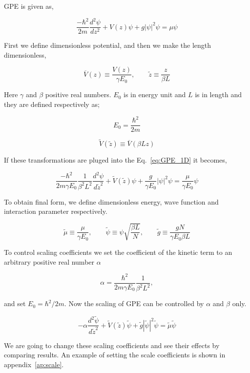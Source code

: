 \documentclass[a4paper,times,12pt]{article}
\begin{document}
GPE is given as,

\begin{equation}
    \label{eq:GPE_1D}
    \frac{-\hbar^2}{2m}\frac{d^2\psi}{dz^2} + V(z)\psi + g|\psi|^2\psi = \mu\psi
\end{equation}

First we define dimensionless potential, and then we make the length dimensionless,

$$ \overline{V}(z) \equiv \frac{V(z)}{\gamma E_0}, \qquad \widetilde{z} \equiv \frac{z}{\beta L} $$

Here $\gamma$ and $\beta$ positive real numbers. $E_0$ is in energy unit and $L$ is in length and they are defined respectively as;

$$E_0 = \frac{\hbar^2}{2m} $$


$$ \widetilde{V}(\widetilde{z}) \equiv \overline{V}(\beta L z) $$ 

If these transformations are pluged into the Eq.~\eqref{eq:GPE_1D} it becomes,

\begin{equation}
    \label{eq:GPE_1D_dimensionless_en_len}
    \frac{-\hbar^2}{2m\gamma E_0} \frac{1}{\beta^2 L^2}  \frac{d^2\psi}{d \widetilde{z}^2} + \widetilde{V}(\widetilde{z})\psi + \frac{g}{\gamma E_0}|\psi|^2\psi = \frac{\mu}{\gamma E_0}\psi
\end{equation}

To obtain final form, we define dimensionless energy, wave function and interaction parameter respectively. 

$$\widetilde{\mu} \equiv \frac{\mu}{\gamma E_0}, \qquad \widetilde{\psi} \equiv \psi{\sqrt{\frac{\beta L}{N}}}, \qquad \widetilde{g} \equiv \frac{gN}{\gamma E_0 \beta L} $$

To control scaling coefficients we set the coefficient of the kinetic term to an arbitrary positive real number $\alpha$  

$$ \alpha = \frac{\hbar^2}{2m\gamma E_0} \frac{1}{\beta^2 L^2} , $$

and set $E_0 = \hbar^2 / 2m$. Now the scaling of GPE can be controlled by $\alpha$ and $\beta$ only.

\begin{equation}
\label{eq:GPE_dimensionless}
    -\alpha\frac{d^2\widetilde{\psi}}{d\widetilde{z}^2} + \widetilde{V}(\widetilde{z})\widetilde{\psi} + \widetilde{g}|\widetilde{\psi}|^2 \widetilde{\psi} = \widetilde{\mu} \widetilde{\psi}
\end{equation}
    
We are going to change these scaling coefficients and see their effects by comparing results. An example of setting the scale coefficients is shown in appendix~\ref{ap:scale}.
\end{document}
